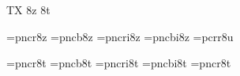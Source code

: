 
\ifx\ffdecl\undefined  \fi

\ffdecl [NewCentury] {\caps{\rm\bf}} {\rm \bf \it \bi} {} {TX} {8z 8t}

\def\caps{\ffvars{r}{b}{!}{!}\ffsetV{caps}{c}\ffsetX} 
\def\nocaps{\ffsetX} 
\nocaps\relax %
\def\ffwarning#1{\ffmessage{FONT warning: NewCentury - \string\caps#1 unavailable}}

\ismacro{}\ifttrue
   \font\tenrm=pncr8z   \sizespec
   \font\tenbf=pncb8z   \sizespec
   \font\tenit=pncri8z  \sizespec
   \font\tenbi=pncbi8z  \sizespec
   \font\tentt=pcrr8u   \sizespec
   \let\tensl=\tenit

   \def\ffnamegen{pnc\ffvarV\capsV 8z}

   
\fi

\ismacro{}\ifttrue
   \font\tenrm=pncr8t   \sizespec
   \font\tenbf=pncb8t   \sizespec
   \font\tenit=pncri8t  \sizespec
   \font\tenbi=pncbi8t  \sizespec
   \font\tentt=pncr8t   \sizespec
   \let\tensl=\tenit

   \def\ffnamegen{pnc\ffvarV\capsV 8t}
\fi

\tenrm

\let\setsimplemath=\relax %

\def\ncTeX{T\kern-.1667em\lower.5ex\hbox{E}\kern-.125emX}
\ifx\origTeX\undefined \let\origTeX=\TeX \fi
\let\TeX=\ncTeX

\ifx\loadmathfonts\relax \endinput \fi
\ifx\mathpreloaded X\else  \fi                     


